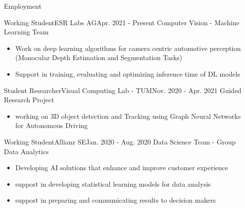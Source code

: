 \documentclass[]{mcdowellcv}
\begin{document}
	\begin{cvsection}{Employment}
		\begin{cvsubsection}{Working Student}{ESR Labs AG}{Apr. 2021 - Present}
			Computer Vision - Machine Learning Team			
			\begin{itemize}
				\item Work on deep learning algorithms for camera centric automotive perception (Monocular Depth Estimation and Segmentation Tasks)
				\item Support in training, evaluating and optimizing inference time of DL models 
			\end{itemize}
		\end{cvsubsection}
		
		\begin{cvsubsection}{Student Researcher}{Visual Computing Lab - TUM}{Nov. 2020 -  Apr. 2021}
			Guided Research Project
			\begin{itemize}
				\item working on 3D object detection and Tracking using Graph Neural Networks for Autonomous Driving
			\end{itemize}
		\end{cvsubsection}

		
		\begin{cvsubsection}{Working Student}{Allianz SE}{Jan. 2020 -  Aug. 2020}
			Data Science Team - Group Data Analytics
			\begin{itemize}
				\item Developing AI solutions that enhance and improve customer experience
				\item support in developing statistical learning models for data analysis
				\item support in preparing and communicating results to decision makers
			\end{itemize}
		\end{cvsubsection}
		

\end{cvsection}
\end{document}
